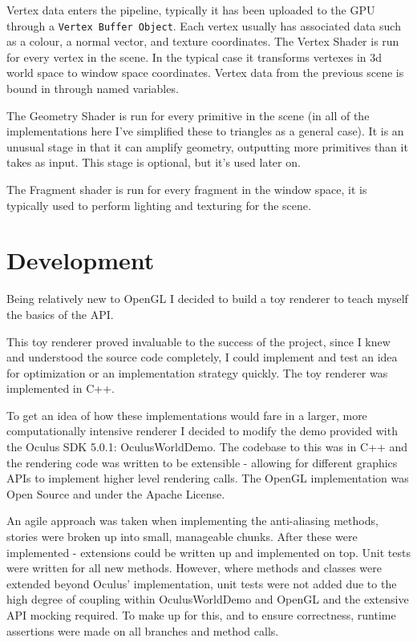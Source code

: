 \documentclass[12pt,a4paper,twoside,openright]{report}
\begin{document}
Vertex data enters the pipeline, typically it has been uploaded to the GPU through a \texttt{Vertex Buffer Object}. Each vertex usually has associated data such as a colour, a normal vector, and texture coordinates.
The Vertex Shader is run for every vertex in the scene. In the typical case it transforms vertexes in 3d world space to window space coordinates. Vertex data from the previous scene is bound in through named variables.

The Geometry Shader is run for every primitive in the scene (in all of the implementations here I've simplified these to triangles as a general case). It is an unusual stage in that it can amplify geometry, outputting more primitives than it takes as input. This stage is optional, but it's used later on.

The Fragment shader is run for every fragment in the window space, it is typically used to perform lighting and texturing for the scene.

\section{Development}

Being relatively new to OpenGL I decided to build a toy renderer to teach myself the basics of the API.

This toy renderer proved invaluable to the success of the project, since I knew and understood the source code completely, I could implement and test an idea for optimization or an implementation strategy quickly. The toy renderer was implemented in C++.

To get an idea of how these implementations would fare in a larger, more computationally intensive renderer I decided to modify the demo provided with the Oculus SDK 5.0.1: OculusWorldDemo.
The codebase to this was in C++ and the rendering code was written to be extensible - allowing for different graphics APIs to implement higher level rendering calls. The OpenGL implementation was Open Source and under the Apache License.

An agile approach was taken when implementing the anti-aliasing methods, stories were broken up into small, manageable chunks. After these were implemented - extensions could be written up and implemented on top.
Unit tests were written for all new methods. However, where methods and classes were extended beyond Oculus' implementation, unit tests were not added due to the high degree of coupling within OculusWorldDemo and OpenGL and the extensive API mocking required. To make up for this, and to ensure correctness, runtime assertions were made on all branches and method calls.
\end{document}
